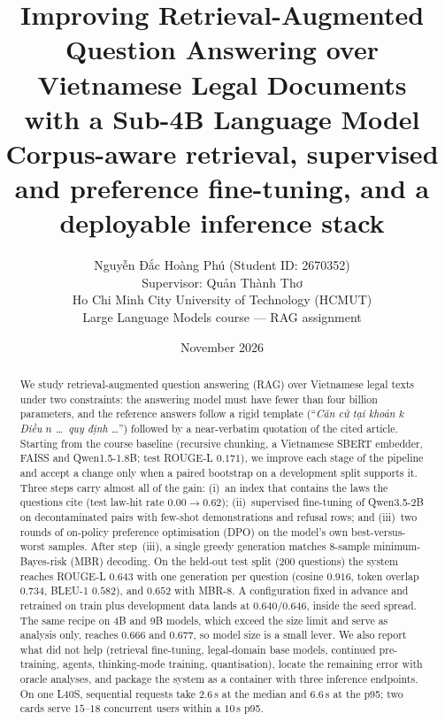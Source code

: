 \documentclass[11pt,a4paper]{article}
\title{\textbf{Improving Retrieval-Augmented Question Answering over Vietnamese Legal Documents\\with a Sub-4B Language Model}\\[2pt]
\large Corpus-aware retrieval, supervised and preference fine-tuning, and a deployable inference stack}
\author{Nguyễn Đắc Hoàng Phú (Student ID: 2670352)\\ Supervisor: Quản Thành Thơ\\ Ho Chi Minh City University of Technology (HCMUT)\\ Large Language Models course --- RAG assignment}
\date{November 2026}
\newcommand{\rl}{ROUGE-L}
\begin{document}
\maketitle

\begin{abstract}
We study retrieval-augmented question answering (RAG) over Vietnamese legal texts under two constraints: the answering model must have fewer than four billion parameters, and the reference answers follow a rigid template (``\textit{Căn cứ tại khoản $k$ Điều $n$ \ldots\ quy định \ldots}'') followed by a near-verbatim quotation of the cited article. Starting from the course baseline (recursive chunking, a Vietnamese SBERT embedder, FAISS and Qwen1.5-1.8B; test \rl{} $0.171$), we improve each stage of the pipeline and accept a change only when a paired bootstrap on a development split supports it. Three steps carry almost all of the gain: (i)~an index that contains the laws the questions cite (test law-hit rate $0.00\!\to\!0.62$); (ii)~supervised fine-tuning of Qwen3.5-2B on decontaminated pairs with few-shot demonstrations and refusal rows; and (iii)~two rounds of on-policy preference optimisation (DPO) on the model's own best-versus-worst samples. After step~(iii), a single greedy generation matches $8$-sample minimum-Bayes-risk (MBR) decoding. On the held-out test split ($200$ questions) the system reaches \rl{} $0.643$ with one generation per question (cosine $0.916$, token overlap $0.734$, BLEU-1 $0.582$), and $0.652$ with MBR-8. A configuration fixed in advance and retrained on train plus development data lands at $0.640$/$0.646$, inside the seed spread. The same recipe on 4B and 9B models, which exceed the size limit and serve as analysis only, reaches $0.666$ and $0.677$, so model size is a small lever. We also report what did not help (retrieval fine-tuning, legal-domain base models, continued pre-training, agents, thinking-mode training, quantisation), locate the remaining error with oracle analyses, and package the system as a container with three inference endpoints. On one L40S, sequential requests take $2.6$\,s at the median and $6.6$\,s at the p95; two cards serve $15$--$18$ concurrent users within a $10$\,s p95.
\end{abstract}

\end{document}
